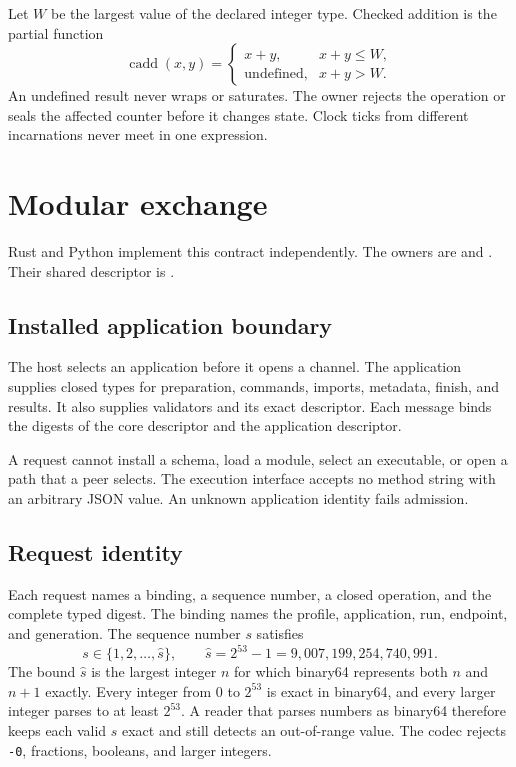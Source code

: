 \documentclass[11pt,a4paper]{article}
\theoremstyle{definition}
\let\NcpTextttBase\texttt
\renewcommand{\texttt}[1]{\mbox{\NcpTextttBase{#1}}}
\newcommand{\cadd}{\operatorname{cadd}}
\begin{document}
Let $W$ be the largest value of the declared integer type. Checked addition is the
partial function
\begin{equation}\label{eq:cadd}
\cadd(x,y)=\begin{cases}x+y, & x+y\leq W,\\ \text{undefined}, & x+y>W.\end{cases}
\end{equation}
An undefined result never wraps or saturates. The owner rejects the operation or seals
the affected counter before it changes state. Clock ticks from different incarnations
never meet in one expression.

\section{Modular exchange}

Rust and Python implement this contract independently. The owners are
 and .
Their shared descriptor is .

\subsection{Installed application boundary}

The host selects an application before it opens a channel. The application supplies
closed types for preparation, commands, imports, metadata, finish, and results. It
also supplies validators and its exact descriptor. Each message binds the digests of
the core descriptor and the application descriptor.

A request cannot install a schema, load a module, select an executable, or open a
path that a peer selects. The execution interface accepts no method string with an
arbitrary JSON value. An unknown application identity fails admission.

\subsection{Request identity}

Each request names a binding, a sequence number, a closed operation, and the complete
typed digest. The binding names the profile, application, run, endpoint, and
generation. The sequence number $s$ satisfies
\begin{equation}\label{eq:sequence-domain}
s\in\{1,2,\ldots,\hat s\},\qquad \hat s=2^{53}-1=9{,}007{,}199{,}254{,}740{,}991.
\end{equation}
The bound $\hat s$ is the largest integer $n$ for which binary64 represents both $n$
and $n+1$ exactly. Every integer from 0 to $2^{53}$ is exact in binary64, and every
larger integer parses to at least $2^{53}$. A
reader that parses numbers as binary64 therefore keeps each valid $s$ exact and still
detects an out-of-range value. The codec rejects \texttt{-0}, fractions, booleans, and
larger integers.
\end{document}
